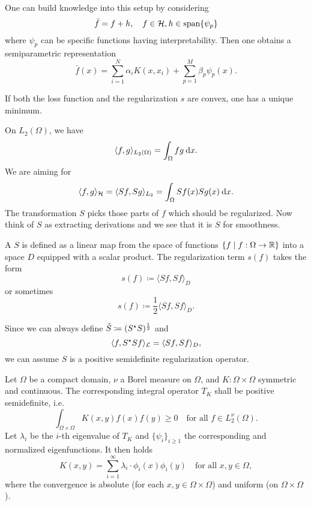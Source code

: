 \documentclass[../lecture-notes.tex]{subfiles}
\begin{document}
\begin{remark}
One can build knowledge into this setup by considering
\[
\bar{f} = f + h, \quad f \in \mathcal{H}, h \in \operatorname*{span}\{ \psi_p \}
\]
where $\psi_p$ can be specific functions having interpretability.
Then one obtains a semiparametric representation
\[
\bar{f}(x) = \sum_{i=1}^N \alpha_i K(x, x_i) + \sum_{p=1}^M \beta_p \psi_p(x).
\]
\end{remark}
\begin{remark}
If both the loss function and the regularization $s$ are convex, one has a unique minimum.
\end{remark}
On $L_2(\Omega)$, we have
\[
	\langle f, g \rangle_{L_2(\Omega)} = \int_\Omega fg \:\mathrm{d} x.
\]
We are aiming for
\[
	\langle f, g \rangle_{\mathcal{H}} = \langle Sf, Sg \rangle_{L_2} = \int_\Omega Sf(x) Sg(x) \:\mathrm{d} x.
\]
The transformation $S$ picks those parts of $f$ which should be regularized. Now think of $S$ as extracting derivations and we see that it is $S$ for smoothness.
\begin{definition} %
\label{thm:42}
A  $S$ is defined as a linear map from the space of functions $\{ f \mid f : \Omega \to \mathbb{R} \}$ into a space $D$ equipped with a scalar product.
The regularization term $s(f)$ takes the form
\[
	s(f) \coloneqq \langle Sf, Sf \rangle_D
\]
or sometimes
\[
	s(f) \coloneqq \frac{1}{2} \langle Sf, Sf \rangle_D.
\]
\end{definition}
\begin{remark}
Since we can always define $\tilde{S} \coloneqq (S^{\star} S)^{\frac{1}{2}}$ and
\[
	\langle f, S^{\star} S f \rangle_{\mathcal{L}} = \langle Sf, Sf \rangle_D,
\]
we can assume $S$ is a positive semidefinite regularization operator.
\end{remark}
\begin{theorem} %
\label{thm:43}
Let $\Omega$ be a compact domain, $\nu$ a Borel measure on $\Omega$, and $K : \Omega \times \Omega$ symmetric and continuous.
The corresponding integral operator $T_K$ shall be positive semidefinite, i.e.
\[
	\int_{\Omega \times \Omega} K(x, y) f(x) f(y) \geq 0 \quad \text{for all } f \in L_2^\nu(\Omega).
\]
Let $\lambda_i$ be the $i$-th eigenvalue of $T_K$ and $\{ \psi_i \}_{i \geq 1}$ the corresponding and normalized eigenfunctions.
It then holds
\[
	K(x, y) = \sum_{i=1}^\infty \lambda_i \cdot \phi_i(x) \phi_i(y) \quad \text{for all } x, y \in \Omega,
\]
where the convergence is absolute (for each $x, y \in \Omega \times \Omega$) and uniform (on $\Omega \times \Omega$).
\end{theorem}
\end{document}
